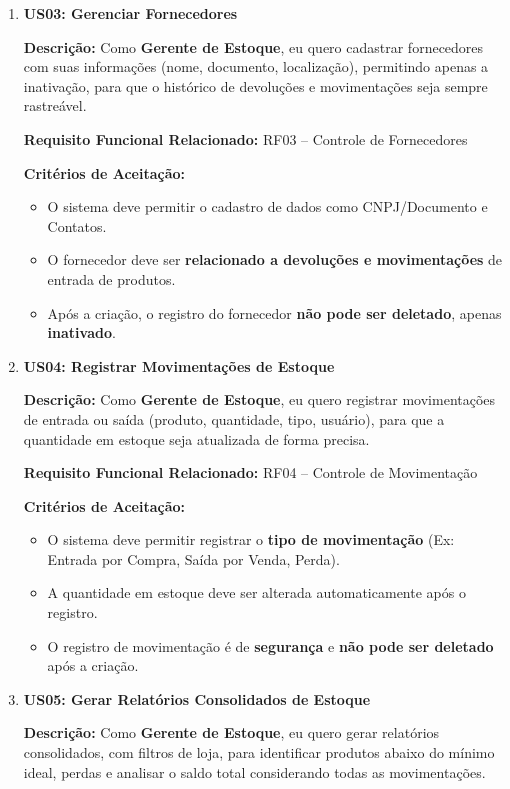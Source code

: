 \documentclass[
	12pt,				%
	openany,			%
	twoside,			%
	a4paper,			%
	english,			%
	brazil				%
	]{abntex2}
\begin{document}
\begin{enumerate}
\item \textbf{US03: Gerenciar Fornecedores}

\textbf{Descri\c{c}\~ao:} Como \textbf{Gerente de Estoque}, eu quero cadastrar fornecedores com suas informações (nome, documento, localização), permitindo apenas a inativação, para que o histórico de devoluções e movimentações seja sempre rastreável.

\textbf{Requisito Funcional Relacionado:} RF03 -- Controle de Fornecedores

\textbf{Crit\'erios de Aceita\c{c}\~ao:}
\begin{itemize}
  \item O sistema deve permitir o cadastro de dados como CNPJ/Documento e Contatos.
  \item O fornecedor deve ser \textbf{relacionado a devoluções e movimentações} de entrada de produtos.
  \item Após a criação, o registro do fornecedor \textbf{não pode ser deletado}, apenas \textbf{inativado}.
\end{itemize}

\item \textbf{US04: Registrar Movimentações de Estoque}

\textbf{Descri\c{c}\~ao:} Como \textbf{Gerente de Estoque}, eu quero registrar movimentações de entrada ou saída (produto, quantidade, tipo, usuário), para que a quantidade em estoque seja atualizada de forma precisa.

\textbf{Requisito Funcional Relacionado:} RF04 -- Controle de Movimentação

\textbf{Crit\'erios de Aceita\c{c}\~ao:}
\begin{itemize}
  \item O sistema deve permitir registrar o \textbf{tipo de movimentação} (Ex: Entrada por Compra, Saída por Venda, Perda).
  \item A quantidade em estoque deve ser alterada automaticamente após o registro.
  \item O registro de movimentação é de \textbf{segurança} e \textbf{não pode ser deletado} após a criação.
\end{itemize}

\item \textbf{US05: Gerar Relatórios Consolidados de Estoque}

\textbf{Descri\c{c}\~ao:} Como \textbf{Gerente de Estoque}, eu quero gerar relatórios consolidados, com filtros de loja, para identificar produtos abaixo do mínimo ideal, perdas e analisar o saldo total considerando todas as movimentações.


\end{enumerate}
\end{document}
